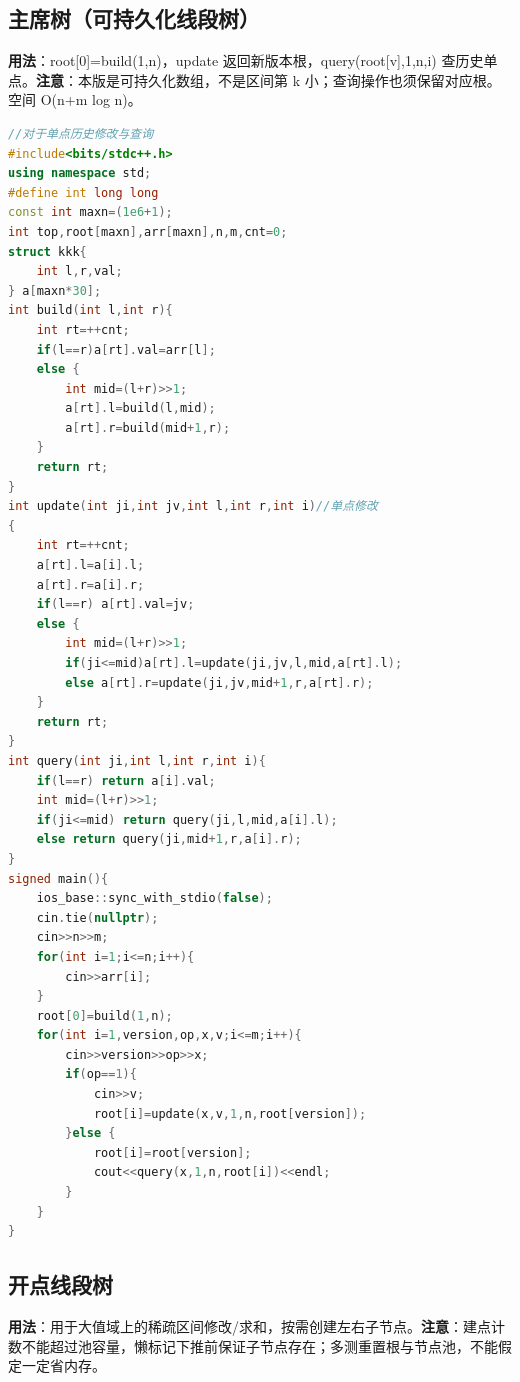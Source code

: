 \documentclass[a4paper,9pt]{extarticle}
\begin{document}
\subsection{主席树（可持久化线段树）}

\textbf{用法}：root[0]=\allowbreak{}build(\allowbreak{}1,\allowbreak{}n)，update 返回新版本根，query(\allowbreak{}root[v],\allowbreak{}1,\allowbreak{}n,\allowbreak{}i) 查历史单点。\textbf{注意}：本版是可持久化数组，不是区间第 k 小；查询操作也须保留对应根。空间 O(n+m log n)。

\begin{lstlisting}[language={C++}]
//对于单点历史修改与查询
#include<bits/stdc++.h>
using namespace std;
#define int long long
const int maxn=(1e6+1);
int top,root[maxn],arr[maxn],n,m,cnt=0;
struct kkk{
    int l,r,val;
} a[maxn*30];
int build(int l,int r){
    int rt=++cnt;
    if(l==r)a[rt].val=arr[l];
    else {
        int mid=(l+r)>>1;
        a[rt].l=build(l,mid);
        a[rt].r=build(mid+1,r);
    }
    return rt;
}
int update(int ji,int jv,int l,int r,int i)//单点修改
{
    int rt=++cnt;
    a[rt].l=a[i].l;
    a[rt].r=a[i].r;
    if(l==r) a[rt].val=jv;
    else {
        int mid=(l+r)>>1;
        if(ji<=mid)a[rt].l=update(ji,jv,l,mid,a[rt].l);
        else a[rt].r=update(ji,jv,mid+1,r,a[rt].r);
    }
    return rt;
}
int query(int ji,int l,int r,int i){
    if(l==r) return a[i].val;
    int mid=(l+r)>>1;
    if(ji<=mid) return query(ji,l,mid,a[i].l);
    else return query(ji,mid+1,r,a[i].r);
}
signed main(){
    ios_base::sync_with_stdio(false);
    cin.tie(nullptr);
    cin>>n>>m;
    for(int i=1;i<=n;i++){
        cin>>arr[i];
    }
    root[0]=build(1,n);
    for(int i=1,version,op,x,v;i<=m;i++){
        cin>>version>>op>>x;
        if(op==1){
            cin>>v;
            root[i]=update(x,v,1,n,root[version]);
        }else {
            root[i]=root[version];
            cout<<query(x,1,n,root[i])<<endl;
        }
    }
}
\end{lstlisting}

\subsection{开点线段树}

\textbf{用法}：用于大值域上的稀疏区间修改/求和，按需创建左右子节点。\textbf{注意}：建点计数不能超过池容量，懒标记下推前保证子节点存在；多测重置根与节点池，不能假定一定省内存。
\end{document}
